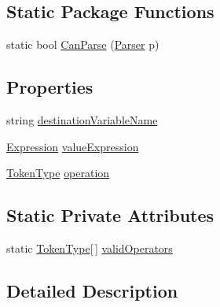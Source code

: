 \subsection*{Static Package Functions}
\begin{DoxyCompactItemize}
\item 
static bool \hyperlink{a00033_a4f021e4c835e429ed5b5bb504a5acf39}{Can\-Parse} (\hyperlink{a00078}{Parser} p)
\end{DoxyCompactItemize}
\subsection*{Properties}
\begin{DoxyCompactItemize}
\item 
string \hyperlink{a00033_a4e764622b716a4138d1fd9e005c41336}{destination\-Variable\-Name}
\item 
\hyperlink{a00054}{Expression} \hyperlink{a00033_a7ada366012cacd98436db80227ee65f5}{value\-Expression}
\item 
\hyperlink{a00040_a301aa7c866593a5b625a8fc158bbeace}{Token\-Type} \hyperlink{a00033_a896df0f23b44e9f20036150b3527d9e5}{operation}
\end{DoxyCompactItemize}
\subsection*{Static Private Attributes}
\begin{DoxyCompactItemize}
\item 
static \hyperlink{a00040_a301aa7c866593a5b625a8fc158bbeace}{Token\-Type}\mbox{[}$\,$\mbox{]} \hyperlink{a00033_af3d393da2f684272251805d3471b6c7a}{valid\-Operators}
\end{DoxyCompactItemize}


\subsection{Detailed Description}


